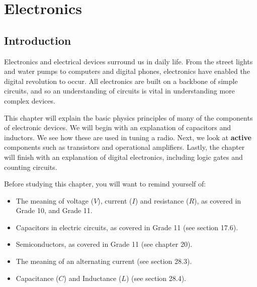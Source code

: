 \chapter{Electronics}
\label{p:em:el12}


\section{Introduction}
Electronics and electrical devices surround us in daily life. From the street lights and water pumps to computers and digital phones, electronics have enabled the digital revolution to occur. All electronics are built on a backbone of simple circuits, and so an understanding of circuits is vital in understanding more complex devices.

This chapter will explain the basic physics principles of many of the components of electronic devices.  We will begin with an explanation of capacitors and inductors. We see how these are used in tuning a radio.  Next, we look at {\bf active} components such as transistors and operational amplifiers. Lastly, the chapter will finish with an explanation of digital electronics, including logic gates and counting circuits. 

Before studying this chapter, you will want to remind yourself of:
\begin{itemize}
\item The meaning of voltage ($V$), current ($I$) and resistance ($R$), as covered in Grade 10, and Grade 11.
\item Capacitors in electric circuits, as covered in Grade 11 (see section 17.6).
\item Semiconductors, as covered in Grade 11 (see chapter 20).
\item The meaning of an alternating current (see section 28.3).
\item Capacitance ($C$) and Inductance ($L$) (see section 28.4).
\end{itemize}

